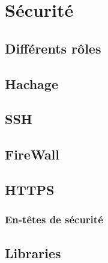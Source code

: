 \section{Sécurité}
\subsection{Différents rôles}
\subsection{Hachage}
\subsection{SSH}
\subsection{FireWall}
\subsection{HTTPS}
\subsubsection{En-têtes de sécurité}
\subsection{Libraries}
